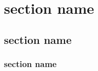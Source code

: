 \documentclass{beamer}
\begin{document}
\section{section name}  
\subsection{section name}
\subsubsection{section name}
\begin{frame}
 \tableofcontents
\end{frame}
\end{document}
